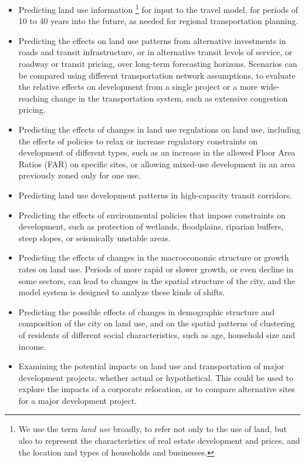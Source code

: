 \begin{itemize}
\item Predicting land use information%
\footnote{We use the term \emph{land use} broadly, to refer not only to the
use of land, but also to represent the characteristics of real estate
development and prices, and the location and types of households and
businesses.%
} for input to the travel model, for periods of 10 to 40 years into
the future, as needed for regional transportation planning.
\item Predicting the effects on land use patterns from alternative investments
in roads and transit infrastructure, or in alternative transit levels
of service, or roadway or transit pricing, over long-term forecasting
horizons. Scenarios can be compared using different transportation
network assumptions, to evaluate the relative effects on development
from a single project or a more wide-reaching change in the transportation
system, such as extensive congestion pricing.
\item Predicting the effects of changes in land use regulations on land
use, including the effects of policies to relax or increase regulatory
constraints on development of different types, such as an increase
in the allowed Floor Area Ratios (FAR) on specific sites, or allowing
mixed-use development in an area previously zoned only for one use.
\item Predicting land use development patterns in high-capacity transit corridors.
\item Predicting the effects of environmental policies that impose constraints
on development, such as protection of wetlands, floodplains, riparian
buffers, steep slopes, or seismically unstable areas.
\item Predicting the effects of changes in the macroeconomic structure or
growth rates on land use. Periods of more rapid or slower growth,
or even decline in some sectors, can lead to changes in the spatial
structure of the city, and the model system is designed to analyze
these kinds of shifts.
\item Predicting the possible effects of changes in demographic structure
and composition of the city on land use, and on the spatial patterns
of clustering of residents of different social characteristics, such
as age, household size and income.
\item Examining the potential impacts on land use and transportation of
major development projects, whether actual or hypothetical. This could
be used to explore the impacts of a corporate relocation, or to compare
alternative sites for a major development project.
\end{itemize}

